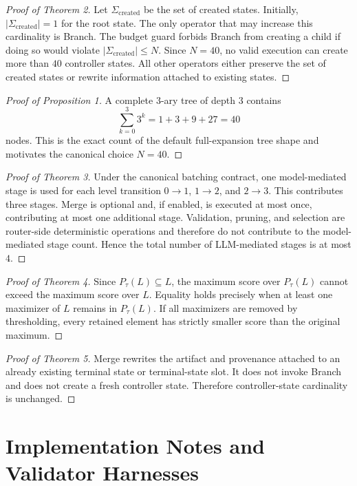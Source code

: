\documentclass[11pt,a4paper]{article}
\numberwithin{equation}{section}
\theoremstyle{definition}
\newcommand{\States}{\Sigma}
\begin{document}
\begin{proof}[Proof of Theorem 2]
Let \(\States_{\mathrm{created}}\) be the set of created states. Initially, \(|\States_{\mathrm{created}}|=1\) for the root state. The only operator that may increase this cardinality is Branch. The budget guard forbids Branch from creating a child if doing so would violate \(|\States_{\mathrm{created}}|\le N\). Since \(N=40\), no valid execution can create more than \(40\) controller states. All other operators either preserve the set of created states or rewrite information attached to existing states.
\end{proof}

\begin{proof}[Proof of Proposition 1]
A complete \(3\)-ary tree of depth \(3\) contains
\[
\sum_{k=0}^{3}3^k = 1+3+9+27 = 40
\]
nodes. This is the exact count of the default full-expansion tree shape and motivates the canonical choice \(N=40\).
\end{proof}

\begin{proof}[Proof of Theorem 3]
Under the canonical batching contract, one model-mediated stage is used for each level transition \(0\to1\), \(1\to2\), and \(2\to3\). This contributes three stages. Merge is optional and, if enabled, is executed at most once, contributing at most one additional stage. Validation, pruning, and selection are router-side deterministic operations and therefore do not contribute to the model-mediated stage count. Hence the total number of LLM-mediated stages is at most \(4\).
\end{proof}

\begin{proof}[Proof of Theorem 4]
Since \(P_\tau(L)\subseteq L\), the maximum score over \(P_\tau(L)\) cannot exceed the maximum score over \(L\). Equality holds precisely when at least one maximizer of \(L\) remains in \(P_\tau(L)\). If all maximizers are removed by thresholding, every retained element has strictly smaller score than the original maximum.
\end{proof}

\begin{proof}[Proof of Theorem 5]
Merge rewrites the artifact and provenance attached to an already existing terminal state or terminal-state slot. It does not invoke Branch and does not create a fresh controller state. Therefore controller-state cardinality is unchanged.
\end{proof}

\section{Implementation Notes and Validator Harnesses}
\end{document}
